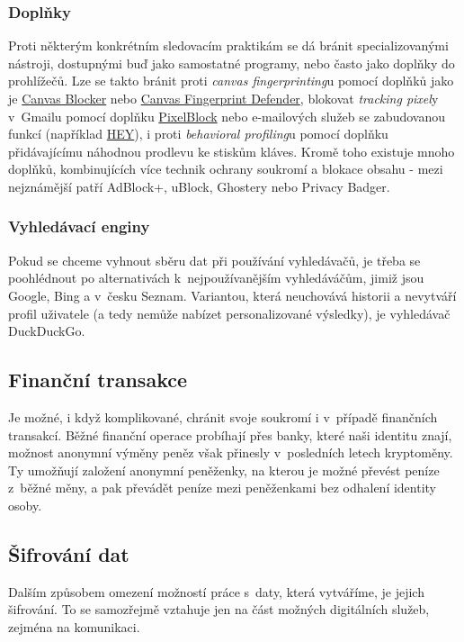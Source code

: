 \subsubsection*{Doplňky}
Proti některým konkrétním sledovacím praktikám se dá bránit specializovanými nástroji, dostupnými buď jako samostatné programy, nebo často jako doplňky do prohlížečů.
Lze se takto bránit proti \textit{canvas fingerprinting}u pomocí doplňků jako je \href{https://chrome.google.com/webstore/detail/canvas-blocker-fingerprin/nomnklagbgmgghhjidfhnoelnjfndfpd?hl=en}{Canvas Blocker} nebo \href{https://chrome.google.com/webstore/detail/canvas-fingerprint-defend/lanfdkkpgfjfdikkncbnojekcppdebfp?hl=en}{Canvas Fingerprint Defender}, blokovat \textit{tracking pixel}y v~Gmailu pomocí doplňku \href{https://chrome.google.com/webstore/detail/pixelblock/jmpmfcjnflbcoidlgapblgpgbilinlem?hl=en}{PixelBlock} nebo e-mailových služeb se zabudovanou funkcí (například \href{https://hey.com}{HEY}), i proti \textit{behavioral profiling}u pomocí doplňku přidávajícímu náhodnou prodlevu ke stiskům kláves.
Kromě toho existuje mnoho doplňků, kombinujících více technik ochrany soukromí a blokace obsahu - mezi nejznámější patří AdBlock+, uBlock, Ghostery nebo Privacy Badger.

\subsubsection*{Vyhledávací enginy}
Pokud se chceme vyhnout sběru dat při používání vyhledávačů, je třeba se poohlédnout po alternativách k~nejpoužívanějším vyhledáváčům, jimiž jsou Google, Bing a v~česku Seznam. Variantou, která neuchovává historii a nevytváří profil uživatele (a tedy nemůže nabízet personalizované výsledky), je vyhledávač DuckDuckGo.

\subsection{Finanční transakce}
Je možné, i když komplikované, chránit svoje soukromí i v~případě finančních transakcí. Běžné finanční operace probíhají přes banky, které naši identitu znají, možnost anonymní výměny peněz však přinesly v~posledních letech kryptoměny. Ty umožňují založení anonymní peněženky, na kterou je možné převést peníze z~běžné měny, a pak převádět peníze mezi peněženkami bez odhalení identity osoby.


\subsection{Šifrování dat}
Dalším způsobem omezení možností práce s~daty, která vytváříme, je jejich šifrování. To se samozřejmě vztahuje jen na část možných digitálních služeb, zejména na komunikaci.
